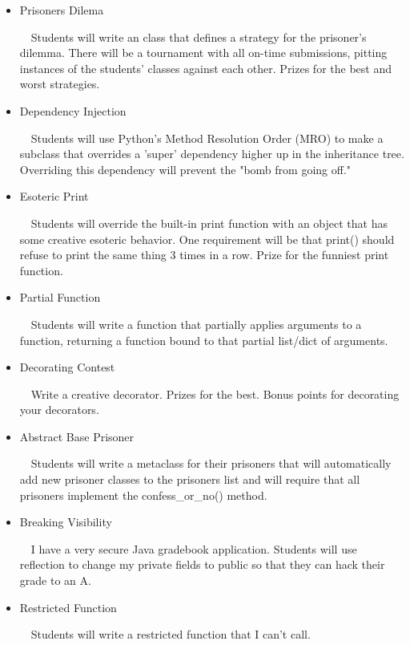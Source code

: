 \documentclass[11pt]{article}
\begin{document}
\begin{itemize} 

\item Prisoners Dilema 

$\ \ \ $ Students will write an class that defines a strategy for the prisoner's dilemma. There will be a tournament with all on-time submissions, pitting instances of the students' classes against each other. Prizes for the best and worst strategies.

\item Dependency Injection 

$\ \ \ $ Students will use Python's Method Resolution Order (MRO) to make a subclass that overrides a 'super' dependency higher up in the inheritance tree. Overriding this dependency will prevent the "bomb from going off."

\item Esoteric Print 

$\ \ \ $ Students will override the built-in print function with an object that has some creative esoteric behavior. One requirement will be that print() should refuse to print the same thing 3 times in a row. Prize for the funniest print function.

\item Partial Function

$\ \ \ $ Students will write a function that partially applies arguments to a function, returning a function bound to that partial list/dict of arguments.

\item Decorating Contest

$\ \ \ $ Write a creative decorator. Prizes for the best. Bonus points for decorating your decorators.

\item Abstract Base Prisoner

$\ \ \ $ Students will write a metaclass for their prisoners that will automatically add new prisoner classes to the prisoners list and will require that all prisoners implement the confess\_or\_no() method.

\item Breaking Visibility 

$\ \ \ $ I have a very secure Java gradebook application. Students will use reflection to change my private fields to public so that they can hack their grade to an A.

\item Restricted Function

$\ \ \ $ Students will write a restricted function that I can't call.
\end{itemize}
\end{document}
